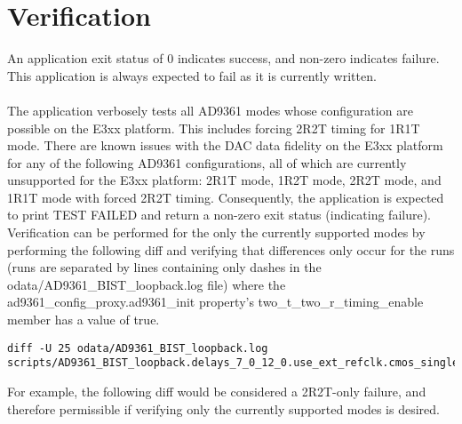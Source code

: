 \pagebreak
\section{Verification}
An application exit status of 0 indicates success, and non-zero indicates failure. This application is always expected to fail as it is currently written. \\ \\
The application verbosely tests all AD9361 modes whose configuration are possible on the E3xx platform. This includes forcing 2R2T timing for 1R1T mode. There are known issues with the DAC data fidelity on the E3xx platform for any of the following AD9361 configurations, all of which are currently unsupported for the E3xx platform: 2R1T mode, 1R2T mode, 2R2T mode, and 1R1T mode with forced 2R2T timing. Consequently, the application is expected to print TEST FAILED and return a non-zero exit status (indicating failure). Verification can be performed for the only the currently supported modes by performing the following diff and verifying that differences only occur for the runs (runs are separated by lines containing only dashes in the odata/AD9361\_BIST\_loopback.log file) where the ad9361\_config\_proxy.ad9361\_init property's two\_t\_two\_r\_timing\_enable member has a value of true.
\begin{lstlisting}
diff -U 25 odata/AD9361_BIST_loopback.log scripts/AD9361_BIST_loopback.delays_7_0_12_0.use_ext_refclk.cmos_single_port_fdd.golden
\end{lstlisting}
For example, the following diff would be considered a 2R2T-only failure, and therefore permissible if verifying only the currently supported modes is desired.
